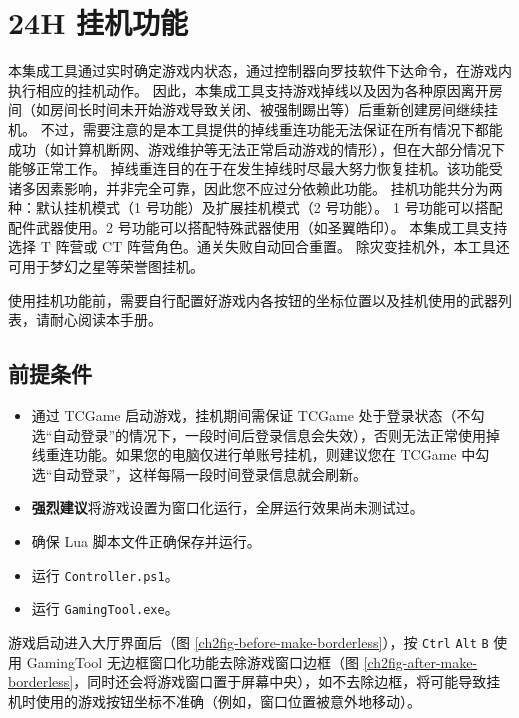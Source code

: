 \section{24H 挂机功能}

本集成工具通过实时确定游戏内状态，通过控制器向罗技软件下达命令，在游戏内执行相应的挂机动作。
因此，本集成工具支持游戏掉线以及因为各种原因离开房间（如房间长时间未开始游戏导致关闭、被强制踢出等）后重新创建房间继续挂机。
不过，需要注意的是本工具提供的掉线重连功能无法保证在所有情况下都能成功（如计算机断网、游戏维护等无法正常启动游戏的情形），但在大部分情况下能够正常工作。
掉线重连目的在于在发生掉线时尽最大努力恢复挂机。该功能受诸多因素影响，并非完全可靠，因此您不应过分依赖此功能。
挂机功能共分为两种：默认挂机模式（1 号功能）及扩展挂机模式（2 号功能）。
1 号功能可以搭配配件武器使用。2 号功能可以搭配特殊武器使用（如圣翼皓印）。
本集成工具支持选择 T 阵营或 CT 阵营角色。通关失败自动回合重置。
除灾变挂机外，本工具还可用于梦幻之星等荣誉图挂机。

使用挂机功能前，需要自行配置好游戏内各按钮的坐标位置以及挂机使用的武器列表，请耐心阅读本手册。

\subsection{前提条件}

\begin{itemize}

\item 通过 TCGame 启动游戏，挂机期间需保证 TCGame 处于登录状态（不勾选“自动登录”的情况下，一段时间后登录信息会失效），否则无法正常使用掉线重连功能。如果您的电脑仅进行单账号挂机，则建议您在 TCGame 中勾选“自动登录”，这样每隔一段时间登录信息就会刷新。

\item \textbf{\color{red}强烈建议}将游戏设置为窗口化运行，全屏运行效果尚未测试过。

\item 确保 Lua 脚本文件正确保存并运行。

\item 运行 \lstinline{Controller.ps1}。

\item 运行 \lstinline{GamingTool.exe}。

\end{itemize}

游戏启动进入大厅界面后（图 \ref{ch2fig-before-make-borderless}），按 \lstinline{Ctrl} \lstinline{Alt} \lstinline{B} 使用 GamingTool 无边框窗口化功能去除游戏窗口边框（图 \ref{ch2fig-after-make-borderless}，同时还会将游戏窗口置于屏幕中央），如不去除边框，将可能导致挂机时使用的游戏按钮坐标不准确（例如，窗口位置被意外地移动）。

